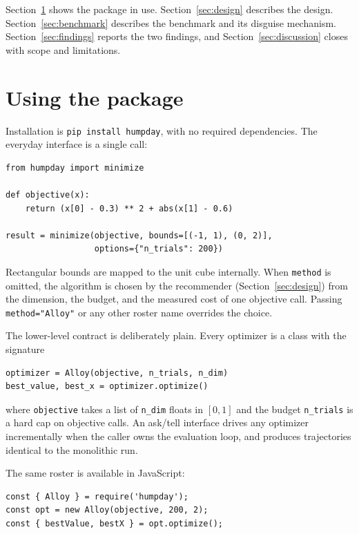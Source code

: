 \documentclass[article]{jss}
\providecommand{\proglang}[1]{\textsf{#1}}
\providecommand{\code}[1]{\texttt{#1}}
\begin{document}
Section~\ref{sec:usage} shows the package in use. Section~\ref{sec:design}
describes the design. Section~\ref{sec:benchmark} describes the benchmark
and its disguise mechanism. Section~\ref{sec:findings} reports the two
findings, and Section~\ref{sec:discussion} closes with scope and
limitations.

\section{Using the package} \label{sec:usage}

Installation is \code{pip install humpday}, with no required dependencies.
The everyday interface is a single call:

\begin{verbatim}
from humpday import minimize

def objective(x):
    return (x[0] - 0.3) ** 2 + abs(x[1] - 0.6)

result = minimize(objective, bounds=[(-1, 1), (0, 2)],
                  options={"n_trials": 200})
\end{verbatim}

Rectangular bounds are mapped to the unit cube internally. When
\code{method} is omitted, the algorithm is chosen by the recommender
(Section~\ref{sec:design}) from the dimension, the budget, and the measured
cost of one objective call. Passing \code{method="Alloy"} or any other
roster name overrides the choice.

The lower-level contract is deliberately plain. Every optimizer is a class
with the signature

\begin{verbatim}
optimizer = Alloy(objective, n_trials, n_dim)
best_value, best_x = optimizer.optimize()
\end{verbatim}

where \code{objective} takes a list of \code{n\_dim} floats in $[0,1]$ and
the budget \code{n\_trials} is a hard cap on objective calls. An ask/tell
interface drives any optimizer incrementally when the caller owns the
evaluation loop, and produces trajectories identical to the monolithic run.

The same roster is available in \proglang{JavaScript}:

\begin{verbatim}
const { Alloy } = require('humpday');
const opt = new Alloy(objective, 200, 2);
const { bestValue, bestX } = opt.optimize();
\end{verbatim}
\end{document}
